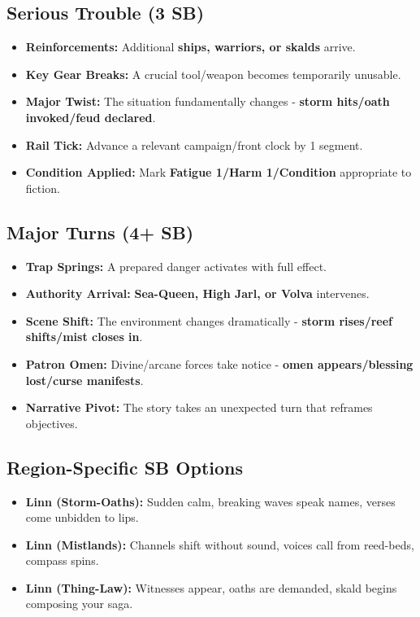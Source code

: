     \subsection*{Serious Trouble (3 SB)}
    \begin{itemize}
    \item \textbf{Reinforcements:} Additional \textbf{ships, warriors, or skalds} arrive.
    \item \textbf{Key Gear Breaks:} A crucial tool/weapon becomes temporarily unusable.
    \item \textbf{Major Twist:} The situation fundamentally changes - \textbf{storm hits/oath invoked/feud declared}.
    \item \textbf{Rail Tick:} Advance a relevant campaign/front clock by 1 segment.
    \item \textbf{Condition Applied:} Mark \textbf{Fatigue 1/Harm 1/Condition} appropriate to fiction.
    \end{itemize}
    
    \subsection*{Major Turns (4+ SB)}
    \begin{itemize}
    \item \textbf{Trap Springs:} A prepared danger activates with full effect.
    \item \textbf{Authority Arrival:} \textbf{Sea-Queen, High Jarl, or Volva} intervenes.
    \item \textbf{Scene Shift:} The environment changes dramatically - \textbf{storm rises/reef shifts/mist closes in}.
    \item \textbf{Patron Omen:} Divine/arcane forces take notice - \textbf{omen appears/blessing lost/curse manifests}.
    \item \textbf{Narrative Pivot:} The story takes an unexpected turn that reframes objectives.
    \end{itemize}
    
    \subsection*{Region-Specific SB Options}
    \begin{itemize}
    \item \textbf{Linn (Storm-Oaths):} Sudden calm, breaking waves speak names, verses come unbidden to lips.
    \item \textbf{Linn (Mistlands):} Channels shift without sound, voices call from reed-beds, compass spins.
    \item \textbf{Linn (Thing-Law):} Witnesses appear, oaths are demanded, skald begins composing your saga.
    \end{itemize}
    